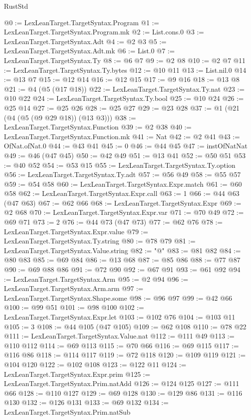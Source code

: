\begin{lexlean}{RustStd}
\begin{coremodule}
@0 := LexLeanTarget.TargetSyntax.Program
@1 := LexLeanTarget.TargetSyntax.Program.mk
@2 := List.cons.{0}
@3 := LexLeanTarget.TargetSyntax.Adt
@4 := @2 @3
@5 := LexLeanTarget.TargetSyntax.Adt.mk
@6 := List.{0}
@7 := LexLeanTarget.TargetSyntax.Ty
@8 := @6 @7
@9 := @2 @8
@10 := @2 @7
@11 := LexLeanTarget.TargetSyntax.Ty.bytes
@12 := @10 @11
@13 := List.nil.{0}
@14 := @13 @7
@15 := @12 @14
@16 := @12 @15
@17 := @9 @16
@18 := @13 @8
@21 := @4 (@5 (@17 @18))
@22 := LexLeanTarget.TargetSyntax.Ty.nat
@23 := @10 @22
@24 := LexLeanTarget.TargetSyntax.Ty.bool
@25 := @10 @24
@26 := @25 @14
@27 := @25 @26
@28 := @25 @27
@29 := @23 @28
@37 := @1 (@21 (@4 (@5 (@9 @29 @18)) (@13 @3)))
@38 := LexLeanTarget.TargetSyntax.Function
@39 := @2 @38
@40 := LexLeanTarget.TargetSyntax.Function.mk
@41 := Nat
@42 := @2 @41
@43 := OfNat.ofNat.{0}
@44 := @43 @41
@45 := 0
@46 := @44 @45
@47 := instOfNatNat
@49 := @46 (@47 @45)
@50 := @42 @49
@51 := @13 @41
@52 := @50 @51
@53 := @40 @52
@54 := @53 @15
@55 := LexLeanTarget.TargetSyntax.Ty.option
@56 := LexLeanTarget.TargetSyntax.Ty.adt
@57 := @56 @49
@58 := @55 @57
@59 := @54 @58
@60 := LexLeanTarget.TargetSyntax.Expr.match
@61 := @60 @58
@62 := LexLeanTarget.TargetSyntax.Expr.call
@63 := 1
@66 := @44 @63 (@47 @63)
@67 := @62 @66
@68 := LexLeanTarget.TargetSyntax.Expr
@69 := @2 @68
@70 := LexLeanTarget.TargetSyntax.Expr.var
@71 := @70 @49
@72 := @69 @71
@73 := 2
@76 := @44 @73 (@47 @73)
@77 := @62 @76
@78 := LexLeanTarget.TargetSyntax.Expr.value
@79 := LexLeanTarget.TargetSyntax.Ty.string
@80 := @78 @79
@81 := LexLeanTarget.TargetSyntax.Value.string
@82 := "@"
@83 := @81 @82
@84 := @80 @83
@85 := @69 @84
@86 := @13 @68
@87 := @85 @86
@88 := @77 @87
@90 := @69 @88 @86
@91 := @72 @90
@92 := @67 @91
@93 := @61 @92
@94 := LexLeanTarget.TargetSyntax.Arm
@95 := @2 @94
@96 := LexLeanTarget.TargetSyntax.Arm.arm
@97 := LexLeanTarget.TargetSyntax.Shape.some
@98 := @96 @97
@99 := @42 @66
@100 := @99 @51
@101 := @98 @100
@102 := LexLeanTarget.TargetSyntax.Expr.let
@103 := @102 @76
@104 := @103 @11
@105 := 3
@108 := @44 @105 (@47 @105)
@109 := @62 @108
@110 := @78 @22
@111 := LexLeanTarget.TargetSyntax.Value.nat
@112 := @111 @49
@113 := @110 @112
@114 := @69 @113
@115 := @70 @66
@116 := @69 @115
@117 := @116 @86
@118 := @114 @117
@119 := @72 @118
@120 := @109 @119
@121 := @104 @120
@122 := @102 @108
@123 := @122 @11
@124 := LexLeanTarget.TargetSyntax.Expr.prim
@125 := LexLeanTarget.TargetSyntax.Prim.natAdd
@126 := @124 @125
@127 := @111 @66
@128 := @110 @127
@129 := @69 @128
@130 := @129 @86
@131 := @116 @130
@132 := @126 @131
@133 := @69 @132
@134 := LexLeanTarget.TargetSyntax.Prim.natSub

\end{coremodule}
\end{lexlean}
